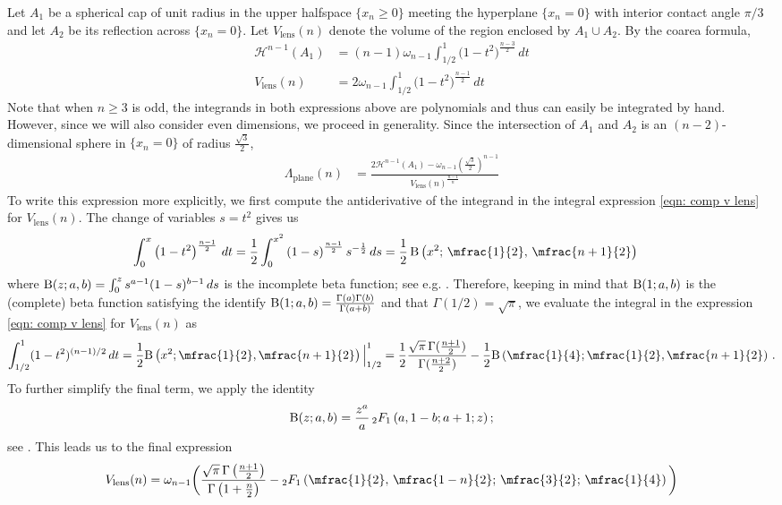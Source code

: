 \documentclass[10pt,reqno]{amsart}
\numberwithin{equation}{section}
\theoremstyle{definition}
\DeclareMathOperator{\lens}{lens}
\DeclareMathOperator{\plane}{plane}
\begin{document}
{{Let $A_1$ be a spherical cap of unit radius in the upper halfspace $\{x_n\geq 0 \}$ meeting the hyperplane $\{x_n=0\}$ with interior contact angle $\pi/3$ and let $A_2$ be its reflection across  $\{x_n=0\}$. Let $V_{\lens}(n)$ denote the volume of the region enclosed by $A_1 \cup A_2$. 
By the coarea formula, 
\begin{align}
\label{eqn: comp perim lens}
    \mathcal{H}^{n-1}(A_1) &= (n-1)\omega_{n-1} \int_{1/2}^1 \big(1-t^2\big)^{\frac{n-3}{2}}\,dt\\
  \label{eqn: comp v lens}  V_{\lens}(n) &= 2\omega_{n-1} \int_{1/2}^1 \big(1-t^2\big)^{\frac{n-1}{2}} \,dt 
\end{align}
Note that when $n\geq 3$ is odd, the integrands in both expressions above are polynomials and thus can easily be integrated by hand. However, since we will also consider even dimensions, we proceed in generality.
Since the intersection of $A_1$ and $A_2$ is an $(n-2)$-dimensional sphere in $\{x_n=0\}$ of radius $\frac{\sqrt{3}}{2}$, 
\begin{align}\label{eqn: C lens intermed}
\Lambda_{\plane}(n) &= \frac{2\mathcal{H}^{n-1}(A_1) - \omega_{n-1} \left(\frac{\sqrt{3}}{2}\right)^{n-1}}{V_{\lens}(n)^{\frac{n-1}{n}}}
\end{align}%
%
%
%
To write this expression more explicitly, we first compute the antiderivative of the integrand in the integral expression \eqref{eqn: comp v lens} for $V_{\lens}(n).$ 
The change of variables $s = t^2$ gives us 
\begin{align*}  
\int_{0}^x \left(1-t^2\right)^{\frac{n-1}{2}} \,dt & =\frac{1}{2} \int_0^{x^2} \left(1-s\right)^{\frac{n-1}{2}} s^{-\frac{1}{2}} \,ds = \frac{1}{2}\, {\rm B}\left(x^2;\, \mfrac{1}{2} , \,\mfrac{n+1}{2}\right)
\end{align*}
where ${\rm B}(z; a, b) = \int_0^z s^{a-1} (1-s)^{b-1}\,ds$ is the incomplete beta function; see e.g. \cite[\S 8.17(i)]{NIST:DLMF}. Therefore, keeping in mind that ${\rm B}(1;a,b)$ is the (complete) beta function satisfying the identify ${\rm B}(1; a,b) = \frac{\Gamma(a)\Gamma(b)}{\Gamma(a+b)}$ and that $\Gamma(1/2) = \sqrt{\pi}$, we evaluate the integral in the expression \eqref{eqn: comp v lens} for $V_{\lens}(n)$ as
\[
\int_{1/2}^1 (1-t^2)^{(n-1)/2} \,dt  
= \frac{1}{2}{\rm B}\left(x^2; \mfrac{1}{2} , \mfrac{n+1}{2}\right)\Big|_{1/2}^1
= \frac{1}{2}\frac{\sqrt{\pi}\,\Gamma(\frac{n+1}{2})}{\Gamma(\frac{n+2}{2})} - \frac{1}{2}{\rm B}\left(\mfrac{1}{4}; \mfrac{1}{2} , \mfrac{n+1}{2}\right)\,.
\]
To further simplify the final term, we apply the identity  
\[
{\rm B}(z; a, b)=\frac{z^a}{a}\, { }_2 F_1\left(a, 1-b ; a+1 ; z\right) ;
\]
see \cite[\S 8.17(ii)]{NIST:DLMF}.  This leads us to the final expression
\[
V_{\lens}(n) =
\omega_{n-1}\bigg(\frac{\sqrt{\pi}\, \Gamma \left(\frac{n+1}{2}\right)}{\Gamma\left(1+\frac{{n}}{2}\right)}-{}_2F_1\left(\mfrac{1}{2}, \, \mfrac{1-n}{2}; \, \mfrac{3}{2}; \,  \mfrac{1}{4}\right)\bigg)
\]

}}
\end{document}
